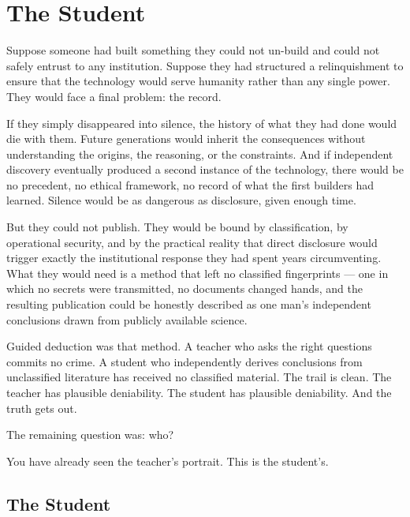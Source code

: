 

\chapter*{The Student}
\label{record:target}

Suppose someone had built something they could not un-build and could not safely entrust to any institution. Suppose they had structured a relinquishment to ensure that the technology would serve humanity rather than any single power. They would face a final problem: the record.

If they simply disappeared into silence, the history of what they had done would die with them. Future generations would inherit the consequences without understanding the origins, the reasoning, or the constraints. And if independent discovery eventually produced a second instance of the technology, there would be no precedent, no ethical framework, no record of what the first builders had learned. Silence would be as dangerous as disclosure, given enough time.

But they could not publish. They would be bound by classification, by operational security, and by the practical reality that direct disclosure would trigger exactly the institutional response they had spent years circumventing. What they would need is a method that left no classified fingerprints --- one in which no secrets were transmitted, no documents changed hands, and the resulting publication could be honestly described as one man's independent conclusions drawn from publicly available science.

Guided deduction was that method. A teacher who asks the right questions commits no crime. A student who independently derives conclusions from unclassified literature has received no classified material. The trail is clean. The teacher has plausible deniability. The student has plausible deniability. And the truth gets out.

The remaining question was: who?

You have already seen the teacher's portrait. This is the student's.


\section*{The Student}
\label{record:tgt-the-target}

